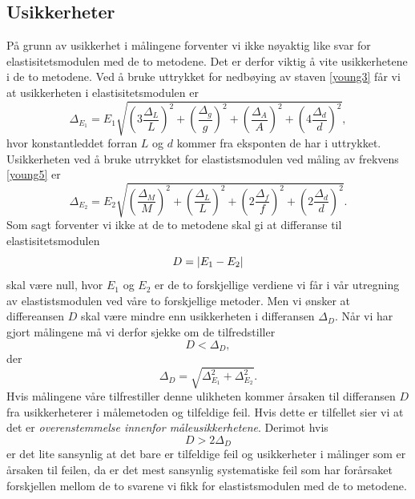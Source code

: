 \documentclass[%
 reprint,
 amsmath,amssymb,
 aps,
]{revtex4-1}
\begin{document}
\subsection{Usikkerheter}
På grunn av usikkerhet i målingene forventer vi ikke nøyaktig like svar for elastisitetsmodulen med de to metodene. Det er derfor viktig å vite usikkerhetene i de to metodene. Ved å bruke uttrykket for nedbøying av staven \eqref{young3} får vi at usikkerheten i elastisitetsmodulen er
\begingroup\makeatletter\def\f@size{8.5}\check@mathfonts
\begin{equation}
  \Delta_{E_1} = E_1 \sqrt{\left(3\frac{\Delta_L}{L}\right)^2+\left(\frac{\Delta_g}{g}\right)^2+\left(\frac{\Delta_A}{A}\right)^2+\left(4\frac{\Delta_d}{d}\right)^2},\label{uncertenty1}
\end{equation}
\endgroup
hvor konstantleddet forran $L$ og $d$ kommer fra eksponten de har i uttrykket.
Usikkerheten ved å bruke utrrykket for elastistsmodulen ved måling av frekvens \eqref{young5} er
\begingroup\makeatletter\def\f@size{8.5}\check@mathfonts
\begin{equation}
  \Delta_{E_2} = E_2 \sqrt{\left(\frac{\Delta_M}{M}\right)^2+\left(\frac{\Delta_L}{L}\right)^2+\left(2\frac{\Delta_f}{f}\right)^2+\left(2\frac{\Delta_d}{d}\right)^2}. \label{uncertenty2}
\end{equation}
\endgroup
Som sagt forventer vi ikke at de to metodene skal gi at differanse til elastisitetsmodulen $$D=\abs{E_1-E_2}$$ skal være null, hvor $E_1$ og $E_2$ er de to forskjellige verdiene vi får i vår utregning av elastistsmodulen ved våre to forskjellige metoder. Men vi ønsker at differeansen $D$ skal være mindre enn usikkerheten i differansen $\Delta_D$. Når vi har gjort målingene må vi derfor sjekke om de tilfredstiller
\begin{equation}
  D < \Delta_D,
\end{equation}
der
\begin{equation}
  \Delta_D = \sqrt{\Delta_{E_1}^2 + \Delta_{E_2}^2}.
\end{equation}
Hvis målingene våre tilfrestiller denne ulikheten kommer årsaken til differansen $D$ fra usikkerheterer i målemetoden og tilfeldige feil. Hvis dette er tilfellet sier vi at det er
\textit{overenstemmelse innenfor måleusikkerhetene}.
Derimot hvis
\begin{equation}
  D > 2\Delta_D
\end{equation}
er det lite sansynlig at det bare er tilfeldige feil og usikkerheter i målinger som er årsaken til feilen, da er det mest sansynlig systematiske feil som har forårsaket forskjellen mellom de to svarene vi fikk for elastistsmodulen med de to metodene.
\end{document}
